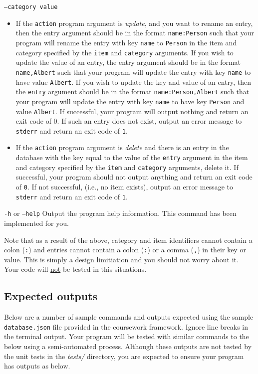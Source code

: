 \documentclass[a4paper]{article}
\begin{document}
\begin{labeling}{ \texttt{--category value} }
\begin{itemize}
        \item If the \texttt{action} program argument is \emph{update}, and you want to rename an entry, then the entry argument should be in the format \texttt{name:Person} such that your program will rename the entry with key \texttt{name} to \texttt{Person} in the item and category specified by the \texttt{item} and \texttt{category} arguments. If you wish to update the value of an entry, the entry argument should be in the format \texttt{name,Albert} such that your program will update the entry with key \texttt{name} to have value \texttt{Albert}. If you wish to update the key and value of an entry, then the \texttt{entry} argument should be in the format \texttt{name:Person,Albert} such that your program will update the entry with key \texttt{name} to have key \texttt{Person} and value \texttt{Albert}. If successful, your program will output nothing and return an exit code of 0.  If such an entry does not exist, output an error message to \texttt{stderr} and return an exit code of \texttt{1}.
    
        \item If the \texttt{action} program argument is \emph{delete} and there is an entry in the database with the key equal to the value of the \texttt{entry} argument in the item and category specified by the \texttt{item} and \texttt{category} arguments, delete it. If successful, your program should not output anything and return an exit code of \texttt{0}. If not successful, (i.e., no item exists), output an error message to \texttt{stderr} and return an exit code of \texttt{1}.
        \end{itemize}
    
    \item[\texttt{-h} or \texttt{--help}]
    Output the program help information. This command has been implemented for you.
\end{labeling}

Note that as a result of the above, category and item identifiers cannot contain a colon (\texttt{:}) and entries cannot contain a colon (\texttt{:}) or a comma (\texttt{,}) in their key or value. This is simply a design limitiation and you should not worry about it. Your code will \underline{not} be tested in this situations.

\subsection*{Expected outputs}\label{sec:cwk outputs}
Below are a number of sample commands and outputs expected using the sample \texttt{database.json} file provided in the coursework framework. Ignore line breaks in the terminal output. Your program will be tested with similar commands to the below using a semi-automated process. Although these outputs are not tested by the unit tests in the \emph{tests/} directory, you are expected to ensure your program has outputs as below.
\end{document}
